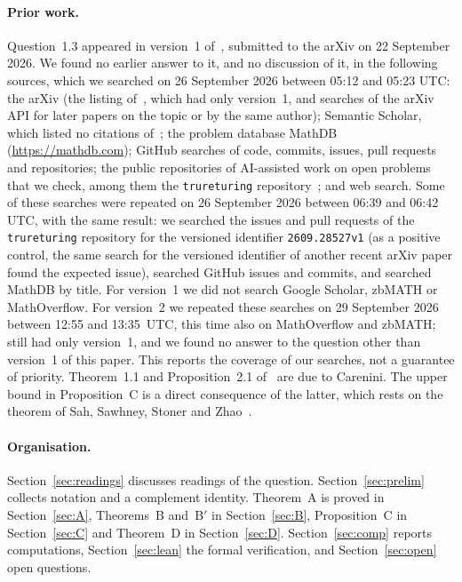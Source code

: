 \documentclass[11pt]{article}
\theoremstyle{remark}
\begin{document}
\paragraph{Prior work.}
Question~1.3 appeared in version~1 of~\cite{car}, submitted to the arXiv on
22 September 2026. We found no earlier answer to it, and no discussion of it,
in the following sources, which we searched on 26 September 2026 between
05:12 and 05:23 UTC: the arXiv (the listing of~\cite{car}, which had only
version~1, and searches of the arXiv API for later papers on the topic or by
the same author); Semantic Scholar, which listed no citations of~\cite{car};
the problem database MathDB (\url{https://mathdb.com}); GitHub searches of
code, commits, issues, pull requests and repositories; the public
repositories of AI-assisted work on open problems that we check, among them
the \texttt{trureturing} repository~\cite{trurepo}; and web search. Some of
these searches were repeated on 26 September 2026 between 06:39 and 06:42 UTC,
with the same result: we searched the issues and pull requests of the
\texttt{trureturing} repository for the versioned identifier
\texttt{2609.28527v1} (as a positive control, the same search for the
versioned identifier of another recent arXiv paper found the expected issue),
searched GitHub issues and commits, and searched MathDB by title. For
version~1 we did not search Google Scholar, zbMATH or MathOverflow. For
version~2 we repeated these searches on 29 September 2026 between 12:55 and
13:35~UTC, this time also on MathOverflow and zbMATH; \cite{car} still had
only version~1, and we found no answer to the question other than version~1
of this paper. This reports the coverage of our searches, not a guarantee of
priority. Theorem~1.1 and Proposition~2.1 of~\cite{car} are due to Carenini. The upper bound in Proposition~C is a
direct consequence of the latter, which rests on the theorem of Sah, Sawhney,
Stoner and Zhao~\cite[Corollary~1.15]{sssz}.

\paragraph{Organisation.}
Section~\ref{sec:readings} discusses readings of the question.
Section~\ref{sec:prelim} collects notation and a complement identity.
Theorem~A is proved in Section~\ref{sec:A}, Theorems~B and~B$'$ in
Section~\ref{sec:B}, Proposition~C in Section~\ref{sec:C} and Theorem~D in
Section~\ref{sec:D}. Section~\ref{sec:comp} reports computations,
Section~\ref{sec:lean} the formal verification, and Section~\ref{sec:open}
open questions.
\end{document}
